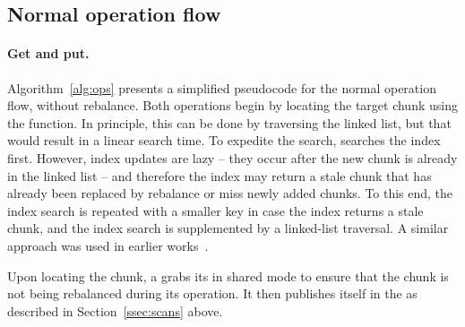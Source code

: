 \subsection{Normal operation flow}
\label{ssec:ops}

\paragraph{Get and put.}

Algorithm~\ref{alg:ops}  presents a simplified pseudocode for the normal operation flow, without rebalance.
Both operations begin by locating the target chunk using the  function. In principle, this can be done by traversing the linked list, but that would result in a linear search time. To expedite the search,    searches the index first. However, index updates are lazy -- they occur after the new chunk is already
in the linked list -- and therefore the index may return a stale chunk that has already been replaced by rebalance or miss newly added chunks. To this end, the index search is repeated with a smaller key in case the index returns a stale chunk, and the index search is supplemented by a linked-list traversal. A similar approach was used in earlier works~\cite{kiwi,tdsl}. 


Upon locating the chunk,  a  grabs its  in shared mode to ensure that the chunk is not being rebalanced during its operation. It then  publishes itself 
in the  as described in Section~\ref{ssec:scans} above.




